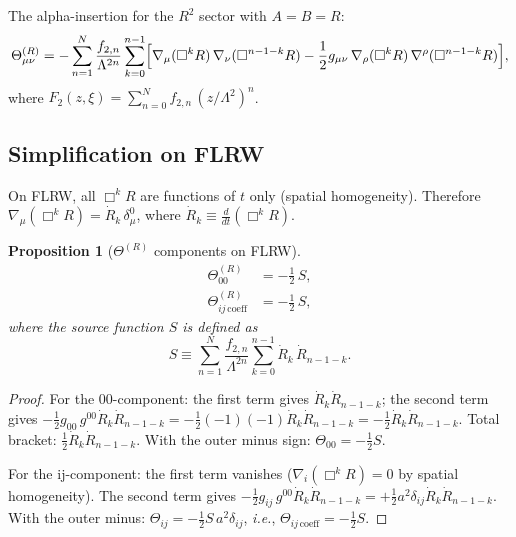 \documentclass[11pt,a4paper]{article}
\newcommand{\ie}{\textit{i.e.}}
\theoremstyle{plain}
\newtheorem{proposition}[theorem]{Proposition}
\theoremstyle{definition}
\begin{document}
The alpha-insertion for the $R^2$ sector with $A = B = R$:
\begin{equation}\label{eq:theta-R}
  \Theta^{(R)}_{\mu\nu} = -\sum_{n=1}^{N} \frac{f_{2,n}}{\Lambda^{2n}}
  \sum_{k=0}^{n-1}
  \Bigl[\nabla_\mu(\Box^k R)\,\nabla_\nu(\Box^{n-1-k} R)
  - \frac{1}{2}g_{\mu\nu}\,\nabla_\rho(\Box^k R)\,
  \nabla^\rho(\Box^{n-1-k} R)\Bigr],
\end{equation}
where $F_2(z,\xi) = \sum_{n=0}^{N} f_{2,n}\,(z/\Lambda^2)^n$.

\subsection{Simplification on FLRW}

On FLRW, all $\Box^k R$ are functions of $t$ only (spatial homogeneity).
Therefore $\nabla_\mu(\Box^k R) = \dot{R}_k\,\delta^0_\mu$, where
$\dot{R}_k \equiv \frac{d}{dt}(\Box^k R)$.

\begin{proposition}[$\Theta^{(R)}$ components on FLRW]\label{prop:theta-flrw}
\begin{align}
  \Theta^{(R)}_{00} &= -\frac{1}{2}\,S, \label{eq:theta00}\\
  \Theta^{(R)}_{ij\,\mathrm{coeff}} &= -\frac{1}{2}\,S,
  \label{eq:thetaij}
\end{align}
where the source function $S$ is defined as
\begin{equation}\label{eq:S-def}
  S \equiv \sum_{n=1}^{N} \frac{f_{2,n}}{\Lambda^{2n}}
  \sum_{k=0}^{n-1} \dot{R}_k\,\dot{R}_{n-1-k}.
\end{equation}
\end{proposition}

\begin{proof}
For the 00-component: the first term gives
$\dot{R}_k\dot{R}_{n-1-k}$; the second term gives
$-\frac{1}{2}g_{00}\,g^{00}\dot{R}_k\dot{R}_{n-1-k}
= -\frac{1}{2}(-1)(-1)\dot{R}_k\dot{R}_{n-1-k}
= -\frac{1}{2}\dot{R}_k\dot{R}_{n-1-k}$.
Total bracket: $\frac{1}{2}\dot{R}_k\dot{R}_{n-1-k}$.
With the outer minus sign: $\Theta_{00} = -\frac{1}{2}S$.

For the ij-component: the first term vanishes ($\nabla_i(\Box^k R) = 0$
by spatial homogeneity). The second term gives
$-\frac{1}{2}g_{ij}\,g^{00}\dot{R}_k\dot{R}_{n-1-k}
= +\frac{1}{2}a^2\delta_{ij}\dot{R}_k\dot{R}_{n-1-k}$.
With the outer minus: $\Theta_{ij} = -\frac{1}{2}S\,a^2\delta_{ij}$,
\ie, $\Theta_{ij\,\text{coeff}} = -\frac{1}{2}S$.
\end{proof}
\end{document}

